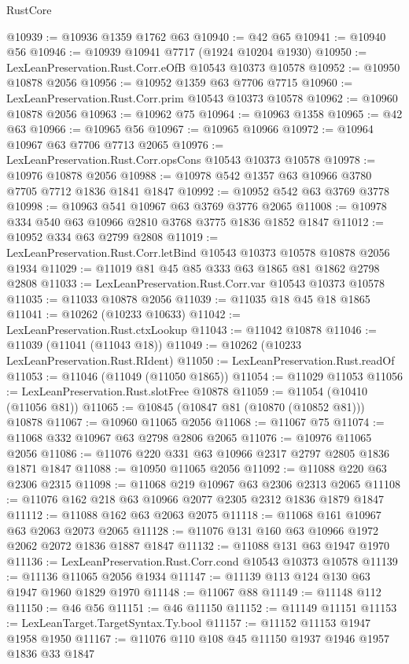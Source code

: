 \begin{lexlean}{RustCore}
\begin{coremodule}
@10939 := @10936 @1359 @1762 @63
@10940 := @42 @65
@10941 := @10940 @56
@10946 := @10939 @10941 @7717 (@1924 @10204 @1930)
@10950 := LexLeanPreservation.Rust.Corr.eOfB @10543 @10373 @10578
@10952 := @10950 @10878 @2056
@10956 := @10952 @1359 @63 @7706 @7715
@10960 := LexLeanPreservation.Rust.Corr.prim @10543 @10373 @10578
@10962 := @10960 @10878 @2056
@10963 := @10962 @75
@10964 := @10963 @1358
@10965 := @42 @63
@10966 := @10965 @56
@10967 := @10965 @10966
@10972 := @10964 @10967 @63 @7706 @7713 @2065
@10976 := LexLeanPreservation.Rust.Corr.opsCons @10543 @10373 @10578
@10978 := @10976 @10878 @2056
@10988 := @10978 @542 @1357 @63 @10966 @3780 @7705 @7712 @1836 @1841 @1847
@10992 := @10952 @542 @63 @3769 @3778
@10998 := @10963 @541 @10967 @63 @3769 @3776 @2065
@11008 := @10978 @334 @540 @63 @10966 @2810 @3768 @3775 @1836 @1852 @1847
@11012 := @10952 @334 @63 @2799 @2808
@11019 := LexLeanPreservation.Rust.Corr.letBind @10543 @10373 @10578 @10878 @2056 @1934
@11029 := @11019 @81 @45 @85 @333 @63 @1865 @81 @1862 @2798 @2808
@11033 := LexLeanPreservation.Rust.Corr.var @10543 @10373 @10578
@11035 := @11033 @10878 @2056
@11039 := @11035 @18 @45 @18 @1865
@11041 := @10262 (@10233 @10633)
@11042 := LexLeanPreservation.Rust.ctxLookup
@11043 := @11042 @10878
@11046 := @11039 (@11041 (@11043 @18))
@11049 := @10262 (@10233 LexLeanPreservation.Rust.RIdent)
@11050 := LexLeanPreservation.Rust.readOf
@11053 := @11046 (@11049 (@11050 @1865))
@11054 := @11029 @11053
@11056 := LexLeanPreservation.Rust.slotFree @10878
@11059 := @11054 (@10410 (@11056 @81))
@11065 := @10845 (@10847 @81 (@10870 (@10852 @81))) @10878
@11067 := @10960 @11065 @2056
@11068 := @11067 @75
@11074 := @11068 @332 @10967 @63 @2798 @2806 @2065
@11076 := @10976 @11065 @2056
@11086 := @11076 @220 @331 @63 @10966 @2317 @2797 @2805 @1836 @1871 @1847
@11088 := @10950 @11065 @2056
@11092 := @11088 @220 @63 @2306 @2315
@11098 := @11068 @219 @10967 @63 @2306 @2313 @2065
@11108 := @11076 @162 @218 @63 @10966 @2077 @2305 @2312 @1836 @1879 @1847
@11112 := @11088 @162 @63 @2063 @2075
@11118 := @11068 @161 @10967 @63 @2063 @2073 @2065
@11128 := @11076 @131 @160 @63 @10966 @1972 @2062 @2072 @1836 @1887 @1847
@11132 := @11088 @131 @63 @1947 @1970
@11136 := LexLeanPreservation.Rust.Corr.cond @10543 @10373 @10578
@11139 := @11136 @11065 @2056 @1934
@11147 := @11139 @113 @124 @130 @63 @1947 @1960 @1829 @1970
@11148 := @11067 @88
@11149 := @11148 @112
@11150 := @46 @56
@11151 := @46 @11150
@11152 := @11149 @11151
@11153 := LexLeanTarget.TargetSyntax.Ty.bool
@11157 := @11152 @11153 @1947 @1958 @1950
@11167 := @11076 @110 @108 @45 @11150 @1937 @1946 @1957 @1836 @33 @1847

\end{coremodule}
\end{lexlean}

